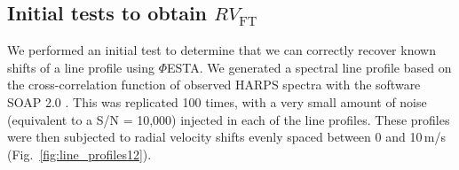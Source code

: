 
\subsection{Initial tests to obtain $RV_\text{FT}$}
\label{sec:Initial_tests}

We performed an initial test to determine that we can correctly recover known shifts of a line profile using $\mathit{\Phi}$ESTA. We generated a spectral line profile based on the cross-correlation function of observed HARPS spectra with the software SOAP 2.0 \cite{Dumusque2014SOAP}. This was replicated 100 times, with a very small amount of 
noise (equivalent to a S/N = 10,000) injected in each of the line profiles. These profiles were then
subjected to radial velocity shifts evenly spaced between 0 and 10\,m/s (Fig.~\ref{fig:line_profiles12}). 

